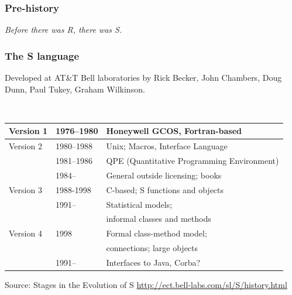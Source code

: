 \documentclass[svgnames, aspectratio=169]{beamer}
\begin{document}
\begin{frame}
  \frametitle{Pre-history}

  \begin{center}
  {\em Before there was R, there was S.}
  \end{center}
  
\end{frame}

\begin{frame}
  \frametitle{The S language}

  Developed at AT\&T Bell laboratories by Rick Becker, John Chambers,
  Doug Dunn, Paul Tukey, Graham Wilkinson.

  ~\\

  \centering
  {\small
    \begin{tabular}{|lll|}
      \hline
      Version 1 & 1976--1980 & Honeywell GCOS, Fortran-based \\
      \hline
      Version 2 & 1980--1988 & Unix; Macros, Interface Language \\
      & 1981--1986 & QPE {\tiny (Quantitative  Programming Environment)} \\
      & 1984--     & General outside licensing; books \\
      \hline
      Version 3 & 1988-1998 & C-based; S functions and objects \\
      & 1991-- & Statistical models; \\
      &        & informal classes and methods \\
      \hline
      Version 4 & 1998 & Formal class-method model; \\
      & & connections; large objects\\
      & 1991-- & Interfaces to Java, Corba?\\
      \hline
    \end{tabular}
  }
  
  {\tiny Source: Stages in the Evolution of S
    \url{http://ect.bell-labs.com/sl/S/history.html}}

\end{frame}
\end{document}
